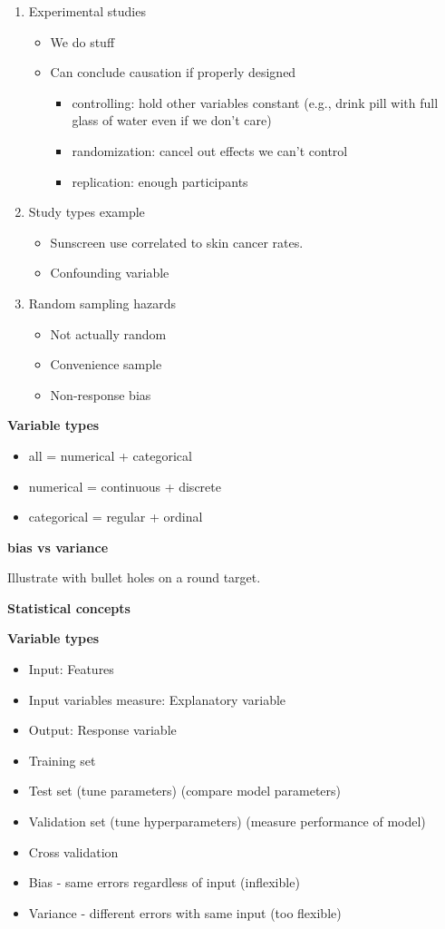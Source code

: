 \begin{enumerate}
\item Experimental studies
  \begin{itemize}
  \item We do stuff
  \item Can conclude causation if properly designed
    \begin{itemize}
    \item controlling: hold other variables constant (e.g., drink pill
      with full glass of water even if we don't care)
    \item randomization: cancel out effects we can't control
    \item replication: enough participants
    \end{itemize}
  \end{itemize}

\item Study types example
  \begin{itemize}
  \item Sunscreen use correlated to skin cancer rates.
  \item Confounding variable
  \end{itemize}

\item Random sampling hazards
  \begin{itemize}
  \item Not actually random
  \item Convenience sample
  \item Non-response bias
  \end{itemize}
\end{enumerate}

\textbf{Variable types}
\begin{itemize}
\item all = numerical + categorical
\item numerical = continuous + discrete
\item categorical = regular + ordinal
\end{itemize}

\textbf{bias vs variance}

Illustrate with bullet holes on a round target.


\textbf{Statistical concepts}

\textbf{Variable types}
\begin{itemize}
\item Input:  Features
\item Input variables measure:  Explanatory variable
\item Output: Response variable
\item Training set
\item Test set (tune parameters) (compare model parameters)
\item Validation set (tune hyperparameters) (measure performance of model)
\item Cross validation
\item Bias - same errors regardless of input (inflexible)
\item Variance - different errors with same input (too flexible)
\end{itemize}

